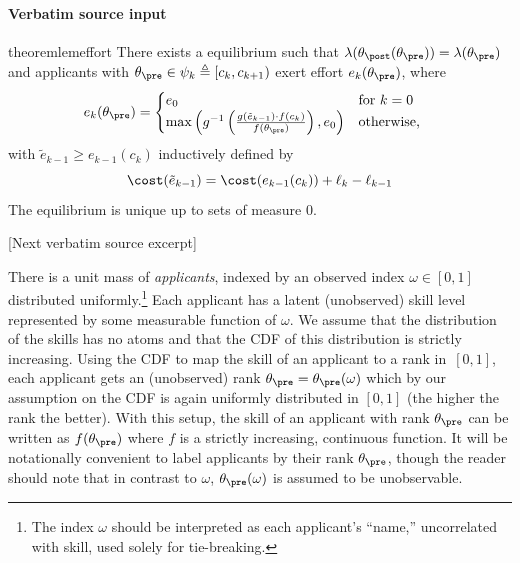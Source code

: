\documentclass[10pt]{article}
\begin{document}
\paragraph{Verbatim source input}
\begin{ReviewVerbatim}
\begin{restatable}{theorem}{lemeffort}
	\label{lem:effort}
	There exists a equilibrium such that $\lambda(\theta_\post(\theta_\pre))=\lambda(\theta_\pre)$ and applicants with $\theta_\pre \in \psi_k\triangleq{ [c_{k}, c_{k+1})}$ exert effort $e_k(\theta_\pre)$, where %
	\begin{align*}
		e_k(\theta_\pre) &= \begin{cases}
			e_0 & \text{for } k = 0\\
			\max\left(g^{-1}\left(\frac{g(\tilde e_{k-1})\cdot f(c_{k})}{f(\theta_\pre)} \right), e_0\right) & \text{otherwise,}
		\end{cases}
	\end{align*}
	\label{lem:secondpricecontimuum}
	with $\tilde e_{k-1}{\geq e_{k-1}(c_k)}$ {inductively defined by} $$
	{\cost(\tilde e_{k-1})=\cost(e_{k-1}(c_k))+\ell_k-\ell_{k-1}}
		$$
		The equilibrium is unique up to sets of  measure 0. %
\end{restatable}

[Next verbatim source excerpt]

There is a unit mass of \textit{applicants}, indexed by an observed index $\omega \in [0,1]$ distributed uniformly.\footnote{The index $\omega$ should be interpreted as each applicant's ``name,'' uncorrelated with skill, used solely for tie-breaking.}  Each applicant has a latent (unobserved) skill level represented by some measurable function of $\omega$.
We assume that {the distribution of the skills} has no atoms and that the CDF of this distribution is strictly increasing.
Using the CDF to map the skill of an applicant to a rank in~$[0,1]$, each applicant gets an (unobserved) rank $\theta_\pre =\theta_\pre(\omega)$ which by our assumption on the CDF is again uniformly distributed in $[0, 1]$ (the higher the rank the better).  With this setup, the skill of an applicant with rank $\theta_\pre$ can be written as $f(\theta_\pre)$ where $f$ is a strictly increasing, continuous function.  {It will be notationally convenient to label applicants by their rank $\theta_\pre$, though the reader should note that in contrast to $\omega$, $\theta_\pre(\omega)$ is assumed to be unobservable.}


\end{ReviewVerbatim}
\end{document}
